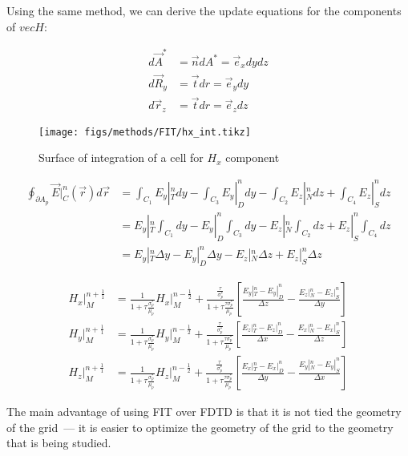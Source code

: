     Using the same method, we can derive the update equations for the components of $vec{H}$:

    \begin{align}
        d\vec{A}^* &= \vec{n}dA^* = \vec{e}_xdydz \\
        d\vec{R}_y &= \vec{t}dr = \vec{e}_ydy \\
        d\vec{r}_z &= \vec{t}dr = \vec{e}_zdz
    \end{align}

    \begin{figure}
        \centering
        \texttt{[image: figs/methods/FIT/hx\_int.tikz]}
        \caption{Surface of integration of a cell for $H_x$ component}
        \label{fig:Hx_Int}
    \end{figure}


    \begin{align}
        \oint_{\partial A_p} \vec{E}|_{C}^{n}(\vec{r})d\vec{r} &= \int_{C_1}E_y|_{T}^ndy
                - \int_{C_3}E_y|_{D}^{n}dy - \int_{C_2}E_z|_{N}^{n}dz + \int_{C_4}E_z|_S^ndz \\
                &= E_y|_T^n\int_{C_1}dy - E_y|_D^n\int_{C_3}dy - E_z|_N^n\int_{C_2}dz + E_z|_S^n\int_{C_4}dz\\
                &= E_y|_T^n\Delta y - E_y|_D^n\Delta y - E_z|_N^n \Delta z + E_z|_S^n \Delta z
    \end{align}

    \begin{align}
        H_x|_M^{n+\frac{1}{1}} &= \frac{1}{1 + \tau\frac{\sigma_p^*}{\mu_p}}H_x|_M^{n-\frac{1}{2}} + \frac{\frac{\tau}{\sigma_p^*}}{1+\tau\frac{\tau\sigma_p^*}{\mu_p}}\left[ \frac{E_y|_T^n - E_y|_D^n}{\Delta z} - \frac{E_z|_N^n - E_z|_S^n}{\Delta y}\right]\\
        H_y|_M^{n+\frac{1}{1}} &= \frac{1}{1 + \tau\frac{\sigma_p^*}{\mu_p}}H_y|_M^{n-\frac{1}{2}} + \frac{\frac{\tau}{\sigma_p^*}}{1+\tau\frac{\tau\sigma_p^*}{\mu_p}}\left[\frac{E_z|_T^n - E_z|_D^n}{\Delta x} - \frac{E_x|_N^n - E_x|_S^n}{\Delta z}\right]\\
        H_z|_M^{n+\frac{1}{1}} &= \frac{1}{1 + \tau\frac{\sigma_p^*}{\mu_p}}H_z|_M^{n-\frac{1}{2}} + \frac{\frac{\tau}{\sigma_p^*}}{1+\tau\frac{\tau\sigma_p^*}{\mu_p}}\left[\frac{E_x|_T^n - E_x|_D^n}{\Delta y} - \frac{E_y|_N^n - E_y|_S^n}{\Delta x}\right]
    \end{align}

    The main advantage of using FIT over FDTD is that it is not tied the geometry of the grid~--- it is easier to optimize the geometry of the grid to the
    geometry that is being studied.


\clearpage
